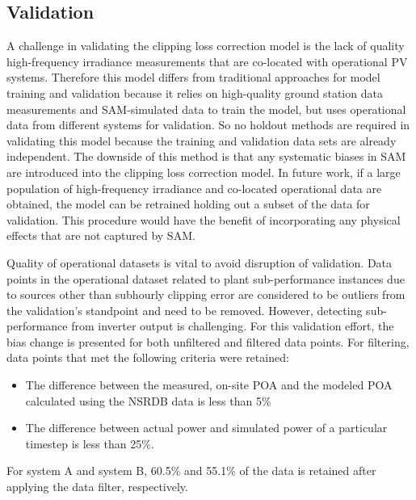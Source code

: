 \documentclass[conference]{IEEEtran}
\begin{document}
\subsection{Validation}
A challenge in validating the clipping loss correction model is the lack of quality high-frequency irradiance measurements that are co-located with operational PV systems. Therefore this model differs from traditional approaches for model training and validation because it relies on high-quality ground station data measurements and SAM-simulated data to train the model, but uses operational data from different systems for validation. So no holdout methods are required in validating this model because the training and validation data sets are already independent. The downside of this method is that any systematic biases in SAM are introduced into the clipping loss correction model. In future work, if a large population of high-frequency irradiance and co-located operational data are obtained, the model can be retrained holding out a subset of the data for validation. This procedure would have the benefit of incorporating any physical effects that are not captured by SAM.

Quality of operational datasets is vital to avoid disruption of validation. Data points in the operational dataset related to plant sub-performance instances due to sources other than subhourly clipping error are considered to be outliers from the validation's standpoint and need to be removed. However, detecting sub-performance from inverter output is challenging. For this validation effort, the bias change is presented for both unfiltered and filtered data points. For filtering, data points that met the following criteria were retained: 
\begin{itemize}
\item The difference between the measured, on-site POA and the modeled POA calculated using the NSRDB \cite{Sengupta2018} data is less than 5\% 
\item The difference between actual power and simulated power of a particular timestep is less than 25\%. 
\end{itemize}
For system A and system B, 60.5\% and 55.1\% of the data is retained after applying the data filter, respectively.
\end{document}
